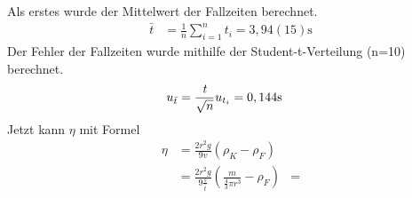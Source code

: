 \documentclass[11pt, a4paper]{article}
\begin{document}
    Als erstes wurde der Mittelwert der Fallzeiten berechnet.
    \begin{align}
        \bar{t} &= \frac{1}{n} \sum_{i=1}^{n} t_i = 3,94(15) \si{\second}
    \end{align}
    Der Fehler der Fallzeiten wurde mithilfe der Student-t-Verteilung (n=10) berechnet.
    \begin{align}
        u_{\bar{t}} &= \frac{{\it t}}{\sqrt{n}} u_{t_i} =  0,144 \si{\second}
    \end{align}
    Jetzt kann $\eta$ mit Formel \cite[(11)]{VIS}
    \begin{align}
        \eta &= \frac{2r^2g}{9v}(\rho_K - \rho_F) \\
        &= \frac{2r^2g}{9\frac{s}{\bar{t}}}(\frac{m}{\frac{4}{3} \pi r^3} - \rho_F)
        &= 
    \end{align}



    
    
\end{document}
